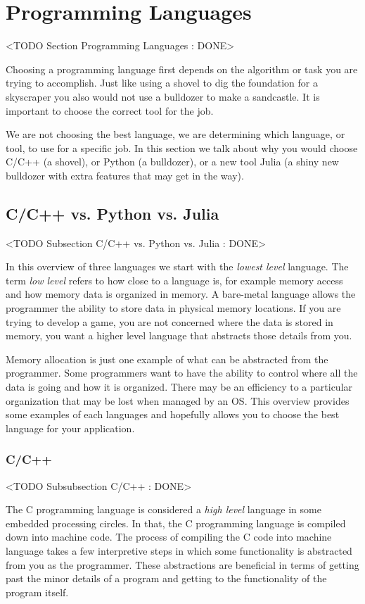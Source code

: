 \section{Programming Languages}
	<TODO Section Programming Languages : DONE>

Choosing a programming language first depends on the algorithm or task you are trying to accomplish. Just like using a shovel to dig the foundation for a skyscraper you also would not use a bulldozer to make a sandcastle. It is important to choose the correct tool for the job. 	
	
We are not choosing the best language, we are determining which language, or tool, to use for a specific job. In this section we talk about why you would choose C/C++ (a shovel), or Python (a bulldozer), or a new tool Julia (a shiny new bulldozer with extra features that may get in the way). 	
	
	
\subsection{C/C++ vs. Python vs. Julia}
	<TODO Subsection C/C++ vs. Python vs. Julia : DONE>

In this overview of three languages we start with the \emph{lowest level} language. The term \emph{low level} refers to how close to \emph{} a language is, for example memory access and how memory data is organized in memory. A bare-metal language allows the programmer the ability to store data in physical memory locations. If you are trying to develop a game, you are not concerned where the data is stored in memory, you want a higher level language that abstracts those details from you. 

Memory allocation is just one example of what can be abstracted from the programmer. Some programmers want to have the ability to control where all the data is going and how it is organized. There may be an efficiency to a particular organization that may be lost when managed by an \ac{OS}. This overview provides some examples of each languages and hopefully allows you to choose the best language for your application.

\subsubsection{C/C++}
	<TODO Subsubsection  C/C++ : DONE>

The C programming language is considered a \emph{high level} language in some embedded processing circles. In that, the C programming language is compiled down into machine code. The process of compiling the C code into machine language takes a few interpretive steps in which some functionality is abstracted from you as the programmer. These abstractions are beneficial in terms of getting past the minor details of a program and getting to the functionality of the program itself. 

